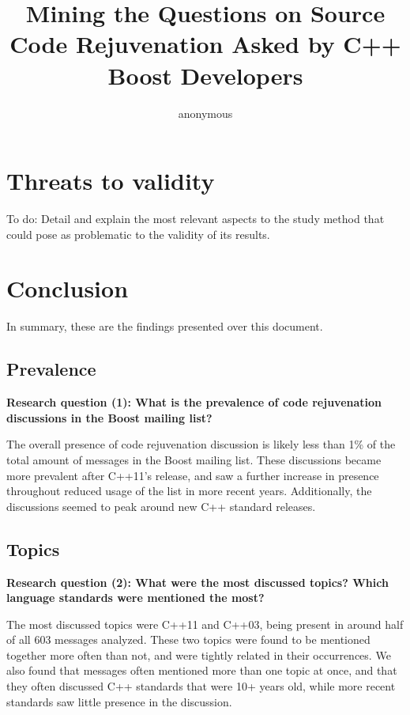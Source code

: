 \documentclass[12pt]{article}
\title{Mining the Questions on Source Code Rejuvenation Asked by C++ Boost Developers}
\author{anonymous}
\begin{document}
\maketitle










\section{Threats to validity}
{\color{red} To do: Detail and explain the most relevant aspects to the study method that could pose as problematic to the validity of its results.}

\section{Conclusion}

In summary, these are the findings presented over this document.

\subsection{Prevalence}

\textbf{Research question (1): What is the prevalence of code rejuvenation discussions in the Boost mailing list?}

The overall presence of code rejuvenation discussion is likely less than 1\% of the total amount of messages in the Boost mailing list. These discussions became more prevalent after C++11's release, and saw a further increase in presence throughout reduced usage of the list in more recent years. Additionally, the discussions seemed to peak around new C++ standard releases.

\subsection{Topics}

\textbf{Research question (2): What were the most discussed topics? Which language standards were mentioned the most?}

The most discussed topics were C++11 and C++03, being present in around half of all 603 messages analyzed. These two topics were found to be mentioned together more often than not, and were tightly related in their occurrences. We also found that messages often mentioned more than one topic at once, and that they often discussed C++ standards that were 10+ years old, while more recent standards saw little presence in the discussion.
\end{document}
